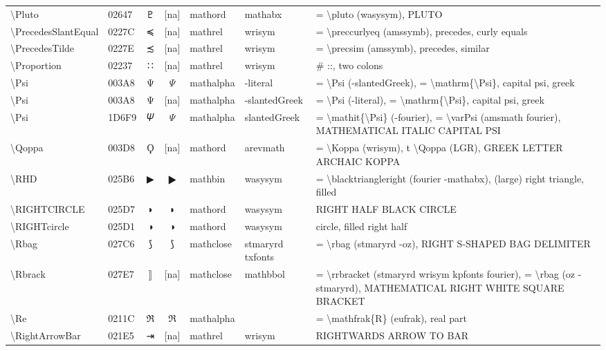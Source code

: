 \documentclass[a4paper,landscape]{article}
\begin{document}
\begin{longtable}{llcclll}
\textbackslash{}Pluto & 02647 & \textsf ♇ & [na] & mathord & mathabx & = \textbackslash{}pluto (wasysym),  PLUTO \\
\textbackslash{}PrecedesSlantEqual & 0227C & ≼ & [na] & mathrel & wrisym & = \textbackslash{}preccurlyeq (amssymb),  precedes,  curly equals \\
\textbackslash{}PrecedesTilde & 0227E & ≾ & [na] & mathrel & wrisym & = \textbackslash{}precsim (amssymb),  precedes,  similar \\
\textbackslash{}Proportion & 02237 & ∷ & [na] & mathrel & wrisym & \# ::, two colons \\
\textbackslash{}Psi & 003A8 & Ψ & $\Psi$ & mathalpha & -literal & = \textbackslash{}Psi (-slantedGreek), = \textbackslash{}mathrm\{\textbackslash{}Psi\}, capital psi, greek \\
\textbackslash{}Psi & 003A8 & Ψ & [na] & mathalpha & -slantedGreek & = \textbackslash{}Psi (-literal),  = \textbackslash{}mathrm\{\textbackslash{}Psi\},  capital psi,  greek \\
\textbackslash{}Psi & 1D6F9 & 𝛹 & $\Psi$ & mathalpha & slantedGreek & = \textbackslash{}mathit\{\textbackslash{}Psi\} (-fourier), = \textbackslash{}varPsi (amsmath fourier), MATHEMATICAL ITALIC CAPITAL PSI \\
\textbackslash{}Qoppa & 003D8 & Ϙ & [na] & mathord & arevmath & = \textbackslash{}Koppa (wrisym), t \textbackslash{}Qoppa (LGR), GREEK LETTER ARCHAIC KOPPA \\
\textbackslash{}RHD & 025B6 & ▶ & $\RHD$ & mathbin & wasysym & = \textbackslash{}blacktriangleright (fourier -mathabx), (large) right triangle, filled \\
\textbackslash{}RIGHTCIRCLE & 025D7 & ◗ & $\RIGHTCIRCLE$ & mathord & wasysym & RIGHT HALF BLACK CIRCLE \\
\textbackslash{}RIGHTcircle & 025D1 & ◑ & $\RIGHTcircle$ & mathord & wasysym & circle, filled right half \\
\textbackslash{}Rbag & 027C6 & ⟆ & $\Rbag$ & mathclose & stmaryrd txfonts & = \textbackslash{}rbag (stmaryrd -oz), RIGHT S-SHAPED BAG DELIMITER \\
\textbackslash{}Rbrack & 027E7 & ⟧ & [na] & mathclose & mathbbol & = \textbackslash{}rrbracket (stmaryrd wrisym kpfonts fourier),  = \textbackslash{}rbag (oz -stmaryrd),  MATHEMATICAL RIGHT WHITE SQUARE BRACKET \\
\textbackslash{}Re & 0211C & ℜ & $\Re$ & mathalpha &  & = \textbackslash{}mathfrak\{R\} (eufrak), real part \\
\textbackslash{}RightArrowBar & 021E5 & ⇥ & [na] & mathrel & wrisym & RIGHTWARDS ARROW TO BAR \\

\end{longtable}
\end{document}
